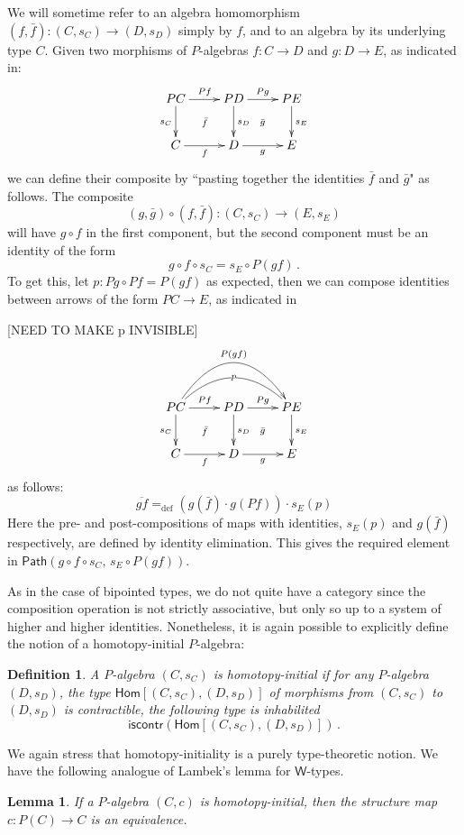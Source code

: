 \documentclass[10pt,a4paper,oneside,reqno]{amsart}
\numberwithin{equation}{section}
\theoremstyle{mythm}
\newtheorem{lemma}[theorem]{Lemma}
\theoremstyle{mydef}
\newtheorem{definition}[theorem]{Definition}
\theoremstyle{myrmk}
\newcommand{\ie}{\text{i.e.\ }}
\newcommand{\defeq}{=_{\mathrm{def}}}
\newcommand{\co}{\colon}
\newcommand{\iscontr}{\mathsf{iscontr}}
\newcommand{\Id}{\mathsf{Path}}
\newcommand{\W}{\mathsf{W}}
\newcommand{\Hom}{\mathsf{Hom}}
\begin{document}
We will sometime refer to an algebra homomorphism $(f, \bar{f}) : (C, s_C) \rightarrow (D, s_D)$ simply by $f$, and to an algebra by its underlying type $C$.
Given two morphisms of $P$-algebras $f \co C \to D$ and $g \co D \to E$, as indicated in:
\[
\xymatrix{
 PC \ar[d]_{s_C} \ar[r]^{Pf}  \ar@{}[dr]|{\bar{f}} &  PD \ar[d]^{s_D}  \ar[r]^{Pg}  \ar@{}[dr]|{\bar{g}} &  PE \ar[d]^{s_E} \\
C \ar[r]_{f}   & D \ar[r]_{g}   & E }
\]
we can define their composite by ``pasting together the identities $\bar{f}$ and $\bar{g}$" as follows.
The composite $$(g, \bar{g}) \circ (f, \bar{f}) \co (C,s_C) \to (E,s_E)$$ will have $g\circ f$ in the first component, but the second component must be an identity of the form
\[
g\circ f\circ s_C = s_E\circ P(gf)\, .
\]
To get this, let $p : Pg\circ Pf = P(gf)$ as expected, then we can compose identities between arrows of the form $PC \to E$, as indicated in

[NEED TO MAKE p INVISIBLE]
\[
\xymatrix{
 PC \ar[d]_{s_C} \ar[r]^{Pf}  \ar@{}[dr]|{\bar{f}} \ar@{}@/^2pc/[rr]|{p} \ar@/^3pc/[rr]^{P(gf)} &  PD \ar[d]^{s_D}  \ar[r]^{Pg}  \ar@{}[dr]|{\bar{g}} &  PE \ar[d]^{s_E} \\
C \ar[r]_{f}   & D \ar[r]_{g}   & E }
\]
as follows:
\[
\overline{gf} \defeq (g(\bar{f})\cdot g(Pf))\cdot s_E(p)
\]
Here the pre- and post-compositions of maps with identities, $s_E(p)$ and $g(\bar{f})$ respectively, are defined by identity elimination.
This gives the required  element in $\Id(g\circ f\circ s_C ,\, s_E\circ P(gf))$.

As in the case of bipointed types, we do not quite have a category since the composition operation is not strictly associative, but only so up to a system of higher and higher identities. 
Nonetheless, it is again possible to explicitly define the notion of a homotopy-initial $P$-algebra:

\begin{definition}\label{def:AlgInit}
A $P$-algebra $(C, s_C)$ is  \emph{homotopy-initial}  if for any $P$-algebra $(D,s_D)$, the type $\Hom[(C, s_C),(D,s_D)]$ of morphisms from $(C, s_C)$ to $(D,s_D)$
is contractible, \ie the following type is inhabilited
\[
 \iscontr(\Hom[(C, s_C),(D,s_D)]) \, .
\]  
\end{definition}

We again stress that homotopy-initiality is a purely type-theoretic notion. We have the following analogue of Lambek's lemma for $\W$-types.


\begin{lemma}\label{lem:IntLambek}
If a $P$-algebra $(C,c)$ is homotopy-initial, then the structure map $c \co P(C) \to C$ is an equivalence.
\end{lemma}
\end{document}
